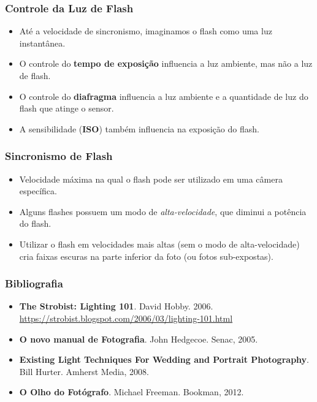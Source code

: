 
\begin{frame}
  \frametitle{Controle da Luz de Flash}
  \begin{itemize}
      \item Até a velocidade de sincronismo, imaginamos o flash como uma luz instantânea.
      \item O controle do \textbf{tempo de exposição} influencia a luz ambiente, mas não
      a luz de flash.
      \item O controle do \textbf{diafragma} influencia a luz ambiente e a quantidade de
      luz do flash que atinge o sensor.
      \item A sensibilidade (\textbf{ISO}) também influencia na exposição do flash.
  \end{itemize}
\end{frame}

\begin{frame}
  \frametitle{Sincronismo de Flash}
  \begin{itemize}
      \item Velocidade máxima na qual o flash pode ser utilizado em uma câmera
      específica.
      \item Alguns flashes possuem um modo de \textit{alta-velocidade}, que diminui
      a potência do flash.
      \item Utilizar o flash em velocidades mais altas (sem o modo de alta-velocidade)
      cria faixas escuras na parte inferior da foto (ou fotos sub-expostas).
  \end{itemize}
\end{frame}


\begin{frame}
    \frametitle{Bibliografia}
    \begin{itemize}
        \item \textbf{The Strobist: Lighting 101}. David Hobby. 2006.
        \hspace{2cm} \url{https://strobist.blogspot.com/2006/03/lighting-101.html}
        \item \textbf{O novo manual de Fotografia}. John Hedgecoe. Senac, 2005.
        \item \textbf{Existing Light Techniques For Wedding and Portrait Photography}.
        Bill Hurter. Amherst Media, 2008.
        \item \textbf{O Olho do Fotógrafo}. Michael Freeman. Bookman, 2012.
    \end{itemize}
\end{frame}


